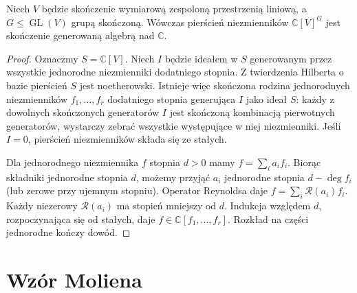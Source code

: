 \begin{twierdzenie}
\label{aa:tw:invariants-finite}
Niech $V$ będzie skończenie wymiarową zespoloną
przestrzenią liniową, a $G\le\operatorname{GL}(V)$
grupą skończoną. Wówczas pierścień niezmienników
$\mathbb C[V]^G$ jest skończenie generowaną algebrą
nad $\mathbb C$.
\end{twierdzenie}
\begin{proof}
Oznaczmy $S=\mathbb C[V]$. Niech $I$ będzie ideałem
w $S$ generowanym przez
wszystkie jednorodne niezmienniki dodatniego stopnia.
Z twierdzenia Hilberta o bazie pierścień $S$ jest
noetherowski. Istnieje więc skończona rodzina
jednorodnych niezmienników $f_1,\ldots,f_r$ dodatniego
stopnia generująca $I$ jako ideał $S$:
każdy z dowolnych skończonych generatorów $I$
jest skończoną kombinacją pierwotnych generatorów,
wystarczy zebrać wszystkie występujące w niej niezmienniki.
Jeśli $I=0$, pierścień niezmienników składa się ze stałych.

Dla jednorodnego niezmiennika $f$ stopnia $d>0$
mamy $f=\sum_i a_i f_i$. Biorąc składniki jednorodne
stopnia $d$, możemy przyjąć $a_i$ jednorodne stopnia
$d-\deg f_i$ (lub zerowe przy ujemnym stopniu).
Operator Reynoldsa daje $f=\sum_i\mathcal R(a_i)f_i$.
Każdy niezerowy $\mathcal R(a_i)$ ma stopień mniejszy
od $d$. Indukcja względem $d$, rozpoczynająca się od
stałych, daje $f\in\mathbb C[f_1,\ldots,f_r]$.
Rozkład na części jednorodne kończy dowód.
\end{proof}

\section{Wzór Moliena}

